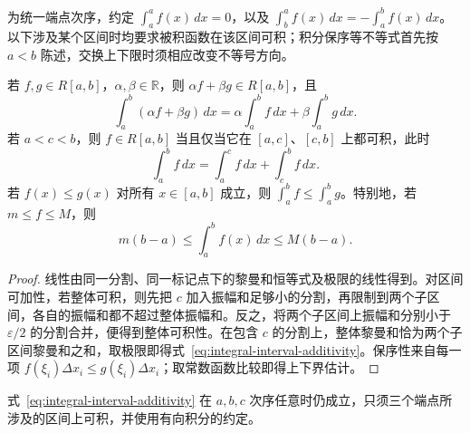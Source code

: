 \documentclass[UTF8,12pt,a4paper,fontset=fandol]{ctexbook}
\begin{document}
为统一端点次序，约定 $\int_a^a f(x)\,dx=0$，以及 $\int_b^a f(x)\,dx=-\int_a^b f(x)\,dx$。以下涉及某个区间时均要求被积函数在该区间可积；积分保序等不等式首先按 $a<b$ 陈述，交换上下限时须相应改变不等号方向。

\begin{theorem}[线性、区间可加性与保序性]
\label{thm:basic-properties-riemann-integral}
若 $f,g\in R[a,b]$，$\alpha,\beta\in\mathbb R$，则 $\alpha f+\beta g\in R[a,b]$，且
\begin{equation}
    \int_a^b(\alpha f+\beta g)\,dx
    =\alpha\int_a^b f\,dx+\beta\int_a^b g\,dx.
    \label{eq:integral-linearity}
\end{equation}
若 $a<c<b$，则 $f\in R[a,b]$ 当且仅当它在 $[a,c]$、$[c,b]$ 上都可积，此时
\begin{equation}
    \int_a^b f\,dx=\int_a^c f\,dx+\int_c^b f\,dx.
    \label{eq:integral-interval-additivity}
\end{equation}
若 $f(x)\leq g(x)$ 对所有 $x\in[a,b]$ 成立，则 $\int_a^b f\leq\int_a^b g$。特别地，若 $m\leq f\leq M$，则
\begin{equation}
    m(b-a)\leq\int_a^b f(x)\,dx\leq M(b-a).
    \label{eq:integral-bounds}
\end{equation}
\end{theorem}
\begin{proof}
线性由同一分割、同一标记点下的黎曼和恒等式及极限的线性得到。对区间可加性，若整体可积，则先把 $c$ 加入振幅和足够小的分割，再限制到两个子区间，各自的振幅和都不超过整体振幅和。反之，将两个子区间上振幅和分别小于 $\varepsilon/2$ 的分割合并，便得到整体可积性。在包含 $c$ 的分割上，整体黎曼和恰为两个子区间黎曼和之和，取极限即得式~\eqref{eq:integral-interval-additivity}。保序性来自每一项 $f(\xi_i)\Delta x_i\leq g(\xi_i)\Delta x_i$；取常数函数比较即得上下界估计。
\end{proof}

式~\eqref{eq:integral-interval-additivity} 在 $a,b,c$ 次序任意时仍成立，只须三个端点所涉及的区间上可积，并使用有向积分的约定。
\end{document}
